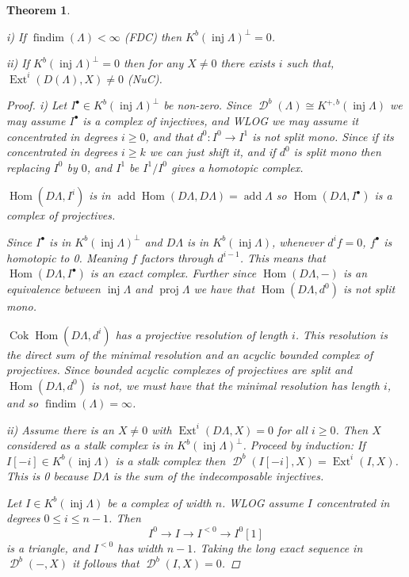 \documentclass[11pt, a4paper, english]{article}
\newtheorem{theorem}{Theorem}[section]
\theoremstyle{definition}
\DeclareMathOperator{\Hom}{Hom}
\DeclareMathOperator{\Ext}{Ext}
\DeclareMathOperator{\cok}{Cok}
\DeclareMathOperator{\findim}{findim}
\DeclareMathOperator{\inj}{inj}
\DeclareMathOperator{\proj}{proj}
\DeclareMathOperator{\add}{add}
\DeclareMathOperator{\D}{\mathcal{D}}
\begin{document}
\begin{theorem} \cite[1.2]{Hap93} \label{thm:findim_implies_inj_generate}
	\item[i)] If $\findim(\Lambda) < \infty$ (FDC) then $K^b(\inj\Lambda)^\perp = 0$.
	\item[ii)] If $K^b(\inj\Lambda)^\perp = 0$ then for any $X\neq 0$ there exists $i$ such that, $\Ext^i(D(\Lambda), X) \neq 0$ (NuC).
	\begin{proof}
		\item[i)] Let $I^\bullet \in K^b(\inj\Lambda)^\perp$ be non-zero. Since $\D^b(\Lambda) \cong K^{+,b}(\inj\Lambda)$ we may assume $I^\bullet$ is a complex of injectives, and WLOG we may assume it concentrated in degrees $i \geq 0$, and that $d^0:I^0 \to I^1$ is not split mono. Since if its concentrated in degrees $i \geq k$ we can just shift it, and if $d^0$ is split mono then replacing $I^0$ by $0$, and $I^1$ be $I^1/I^0$ gives a homotopic complex.
		
		$\Hom(D\Lambda, I^i)$ is in $\add\Hom(D\Lambda, D\Lambda) = \add\Lambda$ so $\Hom(D\Lambda, I^\bullet)$ is a complex of projectives.
		
		
		Since $I^\bullet$ is in $K^b(\inj\Lambda)^\perp$ and $D\Lambda$ is in $K^b(\inj\Lambda)$, whenever $d^if=0$, $f^\bullet$ is homotopic to 0. Meaning $f$ factors through $d^{i-1}$. This means that $\Hom(D\Lambda, I^\bullet)$ is an exact complex. Further since $\Hom(D\Lambda, -)$ is an equivalence between $\inj\Lambda$ and $\proj\Lambda$ we have that $\Hom(D\Lambda, d^0)$ is not split mono.
		
		$\cok\Hom(D\Lambda, d^i)$ has a projective resolution of length $i$. This resolution is the direct sum of the minimal resolution and an acyclic bounded complex of projectives. Since bounded acyclic complexes of projectives are split and $\Hom(D\Lambda, d^0)$ is not, we must have that the minimal resolution has length $i$, and so $\findim(\Lambda) = \infty$.
		
		\item[ii)] Assume there is an $X \neq 0$ with $\Ext^i(D\Lambda, X) = 0$ for all $i \geq 0$. Then $X$ considered as a stalk complex is in $K^b(\inj\Lambda)^\perp$. Proceed by induction: If $I[-i] \in K^b(\inj\Lambda)$ is a stalk complex then $\D^b(I[-i], X) = \Ext^i(I, X)$. This is 0 because $D\Lambda$ is the sum of the indecomposable injectives.
		
		Let $I \in K^b(\inj\Lambda)$ be a complex of width $n$. WLOG assume $I$ concentrated in degrees $0 \leq i \leq n-1$. Then $$I^0 \to I \to I^{<0} \to I^0[1]$$ is a triangle, and $I^{<0}$ has width $n-1$. Taking the long exact sequence in $\D^b(-,X)$ it follows that $\D^b(I, X)=0$.  
	\end{proof}
\end{theorem}
\end{document}
